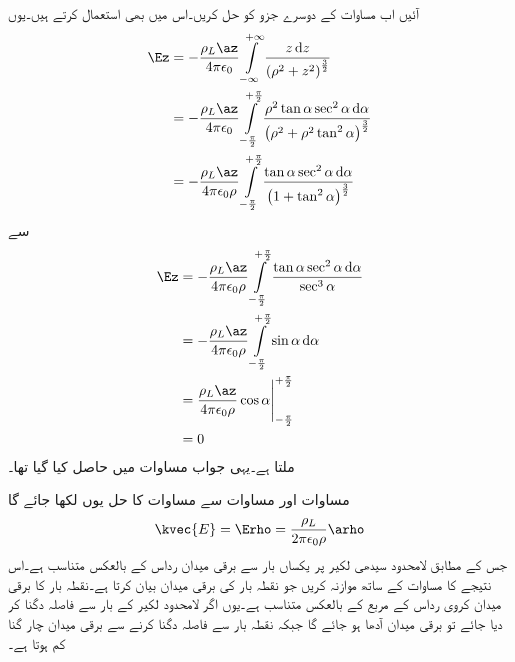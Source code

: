 آئیں اب مساوات  کے   دوسرے جزو کو حل کریں۔اس میں بھی  استعمال کرتے ہیں۔یوں
\begin{align*}
\Ez&=-\frac{\rho_L \az}{4 \pi \epsilon_0}\int\limits_{-\infty}^{+\infty} \frac{z \dif z}{\left(\rho^2+z^2 \right)^{\frac{3}{2}}}\\
&=-\frac{\rho_L \az}{4 \pi \epsilon_0}\int\limits_{-\frac{\pi}{2}}^{+\frac{\pi}{2}} \frac{\rho^2 \tan \alpha  \sec^2 \alpha \dif \alpha}{\left(\rho^2+\rho^2 \tan^2 \alpha \right)^{\frac{3}{2}}}\\
&=-\frac{\rho_L \az}{4 \pi \epsilon_0 \rho}\int\limits_{-\frac{\pi}{2}}^{+\frac{\pi}{2}} \frac{ \tan \alpha  \sec^2 \alpha \dif \alpha}{\left(1+ \tan^2 \alpha \right)^{\frac{3}{2}}}
\end{align*}
سے
\begin{gather}
\begin{aligned}\label{مساوات_کولمب_لامحدود_لکیر_عمودی_میدان}
\Ez&=-\frac{\rho_L \az}{4 \pi \epsilon_0 \rho}\int\limits_{-\frac{\pi}{2}}^{+\frac{\pi}{2}} \frac{ \tan \alpha  \sec^2 \alpha \dif \alpha}{\sec^3 \alpha}\\
&=-\frac{\rho_L \az}{4 \pi \epsilon_0 \rho}\int\limits_{-\frac{\pi}{2}}^{+\frac{\pi}{2}} \sin \alpha \dif \alpha\\
&=\frac{\rho_L \az}{4 \pi \epsilon_0 \rho} \eval{\cos \alpha}_{-\frac{\pi}{2}}^{+\frac{\pi}{2}}\\
&=0
\end{aligned}
\end{gather}
ملتا ہے۔یہی جواب مساوات  میں حاصل کیا گیا تھا۔

مساوات  اور مساوات  سے مساوات   کا حل یوں لکھا جائے گا
\begin{align}\label{مساوات_کولمب_لامحدود_لکیر_رداسی_میدان_پیدا_کرتا_ہے}
\kvec{E}=\Erho=\frac{\rho_L }{2 \pi \epsilon_0 \rho} \arho
\end{align}
جس کے مطابق لامحدود سیدھی لکیر پر یکساں بار سے برقی میدان رداس   کے بالعکس متناسب ہے۔اس نتیجے  کا مساوات  کے ساتھ موازنہ کریں جو نقطہ بار کی برقی میدان بیان کرتا ہے۔نقطہ بار کا برقی میدان کروی رداس کے مربع کے بالعکس متناسب ہے۔یوں اگر لامحدود لکیر کے بار سے فاصلہ دگنا کر دیا جائے تو برقی میدان آدھا ہو جائے گا جبکہ نقطہ بار سے فاصلہ دگنا کرنے سے برقی میدان چار گنا کم ہوتا ہے۔

